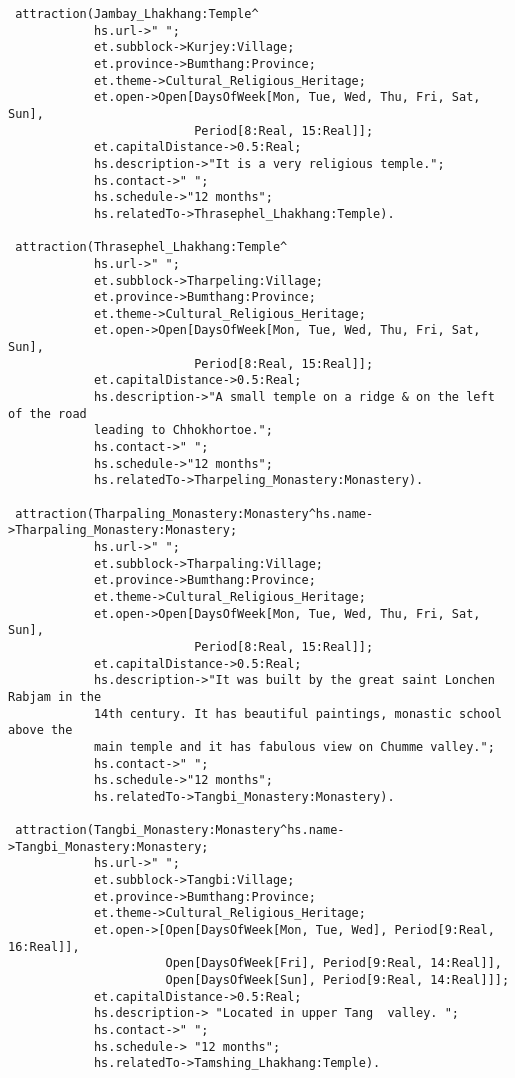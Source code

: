 \begin{verbatim}
 attraction(Jambay_Lhakhang:Temple^
            hs.url->" ";
            et.subblock->Kurjey:Village;
            et.province->Bumthang:Province;
            et.theme->Cultural_Religious_Heritage;
            et.open->Open[DaysOfWeek[Mon, Tue, Wed, Thu, Fri, Sat, Sun],
                          Period[8:Real, 15:Real]];
            et.capitalDistance->0.5:Real;
            hs.description->"It is a very religious temple.";
            hs.contact->" ";
            hs.schedule->"12 months";
            hs.relatedTo->Thrasephel_Lhakhang:Temple).

 attraction(Thrasephel_Lhakhang:Temple^
            hs.url->" ";
            et.subblock->Tharpeling:Village;
            et.province->Bumthang:Province;
            et.theme->Cultural_Religious_Heritage;
            et.open->Open[DaysOfWeek[Mon, Tue, Wed, Thu, Fri, Sat, Sun],
                          Period[8:Real, 15:Real]];
            et.capitalDistance->0.5:Real;
            hs.description->"A small temple on a ridge & on the left of the road
            leading to Chhokhortoe.";
            hs.contact->" ";
            hs.schedule->"12 months";
            hs.relatedTo->Tharpeling_Monastery:Monastery).   
                         
 attraction(Tharpaling_Monastery:Monastery^hs.name->Tharpaling_Monastery:Monastery;
            hs.url->" ";
            et.subblock->Tharpaling:Village;
            et.province->Bumthang:Province;
            et.theme->Cultural_Religious_Heritage;
            et.open->Open[DaysOfWeek[Mon, Tue, Wed, Thu, Fri, Sat, Sun],
                          Period[8:Real, 15:Real]];
            et.capitalDistance->0.5:Real;
            hs.description->"It was built by the great saint Lonchen Rabjam in the
            14th century. It has beautiful paintings, monastic school above the 
            main temple and it has fabulous view on Chumme valley.";
            hs.contact->" ";
            hs.schedule->"12 months";
            hs.relatedTo->Tangbi_Monastery:Monastery).

 attraction(Tangbi_Monastery:Monastery^hs.name->Tangbi_Monastery:Monastery;
            hs.url->" ";
            et.subblock->Tangbi:Village;
            et.province->Bumthang:Province;
            et.theme->Cultural_Religious_Heritage;
            et.open->[Open[DaysOfWeek[Mon, Tue, Wed], Period[9:Real, 16:Real]],
                      Open[DaysOfWeek[Fri], Period[9:Real, 14:Real]],
                      Open[DaysOfWeek[Sun], Period[9:Real, 14:Real]]];
            et.capitalDistance->0.5:Real;
            hs.description-> "Located in upper Tang  valley. ";
            hs.contact->" ";
            hs.schedule-> "12 months";
            hs.relatedTo->Tamshing_Lhakhang:Temple).


\end{verbatim}
